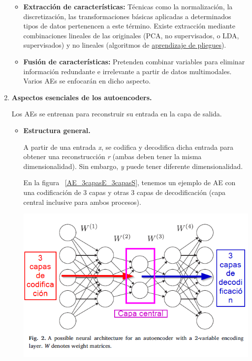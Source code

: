 \begin{enumerate}
\begin{itemize}
        \item \textbf{Extracción de características:} Técnicas como la normalización, la discretización, las transformaciones básicas aplicadas a determinados tipos de datos pertenencen a este término. Existe extracción mediante combinaciones lineales de las originales (PCA, no supervisados, o LDA, supervisados) y no lineales (algoritmos de \hyperlink{https://scikit-learn.org/stable/modules/manifold.html}{aprendizaje de pliegues}).
        
        \item \textbf{Fusión de características:} Pretenden combinar variables para eliminar información redundante e irrelevante a partir de datos multimodales. Varios AEs se enfocarán en dicho aspecto.
        
    \end{itemize}
    
    \newpage
    \item \textbf{Aspectos esenciales de los autoencoders.} \par Los AEs se entrenan para reconstruir su entrada en la capa de salida. 
    
    \begin{itemize}
        \item \textbf{Estructura general.}
            \par A partir de una entrada \textit{x}, se codifica y decodifica dicha entrada para obtener una reconstrucción \textit{r} (ambas deben tener la misma dimensionalidad). Sin embargo, \textit{y} puede tener diferente dimensionalidad.
            
            En la figura ~\ref{AE_3capasE_3capasS}, tenemos un ejemplo de AE con una codificación de 3 capas y otras 3 capas de decodificación (capa central inclusive para ambos procesos).
            
            \begin{center}
                \includegraphics[width=.8\textwidth]{imagenes/AE_3capasE_3capasS.png} 
                \label{AE_3capasE_3capasS}
            \end{center}


\end{itemize}
\end{enumerate}
